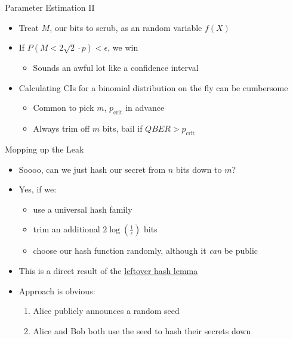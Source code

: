 \documentclass[pdf]{beamer}
\begin{document}
\begin{frame}{Parameter Estimation II}
  \begin{itemize}
  \item Treat $M$, our bits to scrub, as an random variable $f(X)$
  \item If $P(M < 2\sqrt{2} \cdot p) < \epsilon$, we win
    \begin{itemize}
    \item Sounds an awful lot like a confidence interval
    \end{itemize}
  \item Calculating CIs for a binomial distribution on the fly can be cumbersome
    \begin{itemize}
    \item Common to pick $m$, $p_\text{crit}$ in advance
    \item Always trim off $m$ bits, bail if $QBER > p_\text{crit}$
    \end{itemize}
  \end{itemize}
\end{frame}
\begin{frame}{Mopping up the Leak}
  \begin{itemize}
  \item Soooo, can we just hash our secret from $n$ bits down to $m$?
  \item Yes, if we:
    \begin{itemize}
    \item use a universal hash family
    \item trim an additional $2 \log \left( \frac{1}{\epsilon} \right)$ bits
    \item choose our hash function randomly, although it \emph{can} be public
    \end{itemize}
  \item This is a direct result of the
    \underline{\href{https://www.cs.bu.edu/~reyzin/teaching/s11cs937/notes-leo-1.pdf}{leftover
        hash lemma}}
  \item Approach is obvious:
    \begin{enumerate}
    \item Alice publicly announces a random seed
    \item Alice and Bob both use the seed to hash their secrets down
    \end{enumerate}
  \end{itemize}
\end{frame}
\end{document}
